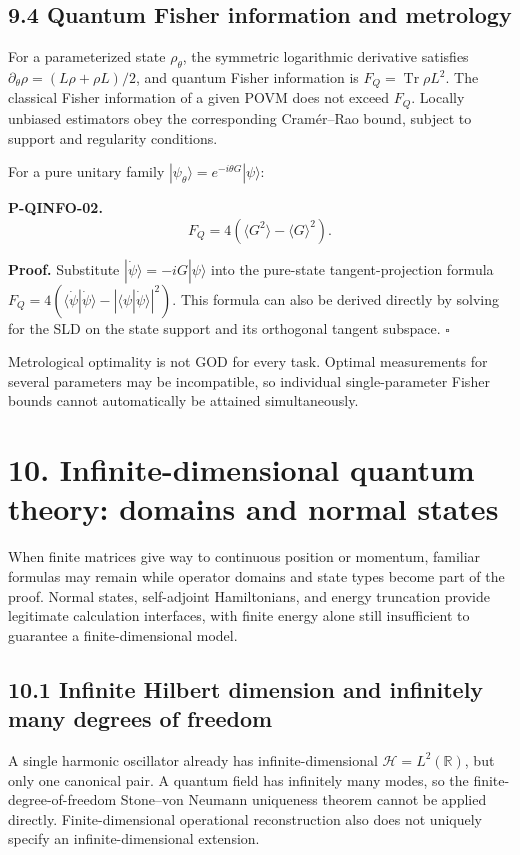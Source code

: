 \documentclass[
  11pt,
  oneside]{book}
\begin{document}
\section{9.4 Quantum Fisher information and metrology}

For a parameterized state \(\rho_\theta\), the symmetric logarithmic
derivative satisfies \(\partial_\theta\rho=(L\rho+\rho L)/2\), and
quantum Fisher information is \(F_Q=\operatorname{Tr}\rho L^2\). The
classical Fisher information of a given POVM does not exceed \(F_Q\).
Locally unbiased estimators obey the corresponding Cramér--Rao bound,
subject to support and regularity conditions.

For a pure unitary family
\(|\psi_\theta\rangle=e^{-i\theta G}|\psi\rangle\):

\label{p-qinfo-02}{}

\textbf{P-QINFO-02.} \[
F_Q=4(\langle G^2\rangle-\langle G\rangle^2).
\]

\textbf{Proof.} Substitute \(|\dot\psi\rangle=-iG|\psi\rangle\) into the
pure-state tangent-projection formula
\(F_Q=4(\langle\dot\psi|\dot\psi\rangle-
|\langle\psi|\dot\psi\rangle|^2)\). This formula can also be derived
directly by solving for the SLD on the state support and its orthogonal
tangent subspace. \(\square\)

Metrological optimality is not GOD for every task. Optimal measurements
for several parameters may be incompatible, so individual
single-parameter Fisher bounds cannot automatically be attained
simultaneously.

\chapter{10. Infinite-dimensional quantum theory: domains and normal
states}\label{ch-10}

When finite matrices give way to continuous position or momentum,
familiar formulas may remain while operator domains and state types
become part of the proof. Normal states, self-adjoint Hamiltonians, and
energy truncation provide legitimate calculation interfaces, with finite
energy alone still insufficient to guarantee a finite-dimensional model.

\section{10.1 Infinite Hilbert dimension and infinitely many degrees of
freedom}

A single harmonic oscillator already has infinite-dimensional
\(\mathcal H=L^2(\mathbb R)\), but only one canonical pair. A quantum
field has infinitely many modes, so the finite-degree-of-freedom
Stone--von Neumann uniqueness theorem cannot be applied directly.
Finite-dimensional operational reconstruction also does not uniquely
specify an infinite-dimensional extension.
\end{document}

